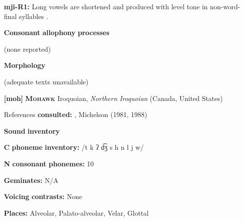 \begin{styleBody}
\textbf{mji-R1:} Long vowels are shortened and produced with level tone in non-word-final syllables \citep[117]{Clark2008}.
\end{styleBody}

\begin{styleBody}
\textbf{Consonant} \textbf{allophony} \textbf{processes}
\end{styleBody}

\begin{styleBody}
(none reported)
\end{styleBody}

\begin{styleBody}
\textbf{Morphology}
\end{styleBody}

\begin{styleBody}
(adequate texts unavailable)
\end{styleBody}

\begin{styleBody}
\textbf{[moh]}   \textbf{\textsc{Mohawk}}  Iroquoian, \textit{Northern} \textit{Iroquoian} (Canada, United States)
\end{styleBody}

\begin{styleBody}
References \textbf{consulted:} \citet{Bonvillain1973}, Michelson (1981, 1988)
\end{styleBody}

\begin{styleBody}
\textbf{Sound} \textbf{inventory}
\end{styleBody}

\begin{styleBody}
\textbf{C} \textbf{phoneme} \textbf{inventory:} /t k ʔ d͡ʒ s h n l j w/
\end{styleBody}

\begin{styleBody}
\textbf{N} \textbf{consonant} \textbf{phonemes:} 10
\end{styleBody}

\begin{styleBody}
\textbf{Geminates:} N/A
\end{styleBody}

\begin{styleBody}
\textbf{Voicing} \textbf{contrasts:} None
\end{styleBody}

\begin{styleBody}
\textbf{Places:} Alveolar, Palato-alveolar, Velar, Glottal
\end{styleBody}

